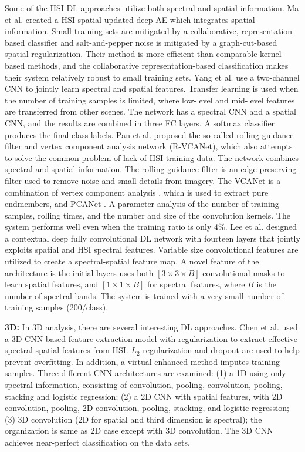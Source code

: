 \documentclass[12pt]{spieman}
\begin{document}
\begin{spacing}{1}
Some of the HSI DL approaches utilize both spectral and spatial information. Ma et al. \cite{ma2016spectral} created a HSI spatial updated deep AE which integrates spatial information. Small training sets are mitigated by a collaborative, representation-based classifier and salt-and-pepper noise is mitigated by a graph-cut-based spatial regularization. Their method is more efficient than comparable kernel-based methods, and the collaborative representation-based classification makes their system relatively robust to small training sets. Yang et al. \cite{Yang2016Two} use a two-channel CNN to jointly learn spectral and spatial features. Transfer learning is used when the number of training samples is limited, where low-level and mid-level features are transferred from other scenes. The network has a spectral CNN and a spatial CNN, and the results are combined in three FC layers. A softmax classifier produces the final class labels. Pan et al. \cite{Pan2017RVCANet} proposed the so called rolling guidance filter and vertex component analysis network (R-VCANet), which also attempts to solve the common problem of lack of HSI training data. The network combines spectral and spatial information. The rolling guidance filter is an edge-preserving filter used to remove noise and small details from imagery. The VCANet is a combination of vertex component analysis \cite{nascimento2005vertex} , which is used to extract pure endmembers, and PCANet \cite{Chan2015PCANet} . A parameter analysis of the number of training samples, rolling times, and the number and size of the convolution kernels. The system performs well even when the training ratio is only 4\%. Lee et al. \cite{Lee2016Contextual} designed a contextual deep fully convolutional DL network with fourteen layers that jointly exploits spatial and HSI spectral features. Variable size convolutional features are utilized to create a spectral-spatial feature map. A novel feature of the architecture is the initial layers uses both $[3 \times 3 \times B]$ convolutional masks to learn spatial features, and $[1 \times 1 \times B]$ for spectral features, where $B$ is the number of spectral bands. The system is trained with a very small number of training samples (200/class).

\textbf{3D:} In 3D analysis, there are several interesting DL approaches. Chen et al. \cite{Chen2016Deep} used a 3D CNN-based feature extraction model with regularization to extract effective spectral-spatial features from HSI. $L_{2}$ regularization and dropout are used to help prevent overfitting. In addition, a virtual enhanced method imputes training samples. Three different CNN architectures are examined: (1) a 1D using only spectral information, consisting of convolution, pooling, convolution, pooling, stacking and logistic regression; (2) a 2D CNN with spatial features, with 2D convolution, pooling, 2D convolution, pooling, stacking, and logistic regression; (3) 3D convolution (2D for spatial and third dimension is spectral); the organization is same as 2D case except with 3D convolution. The 3D CNN achieves near-perfect classification on the data sets.


\end{spacing}
\end{document}
